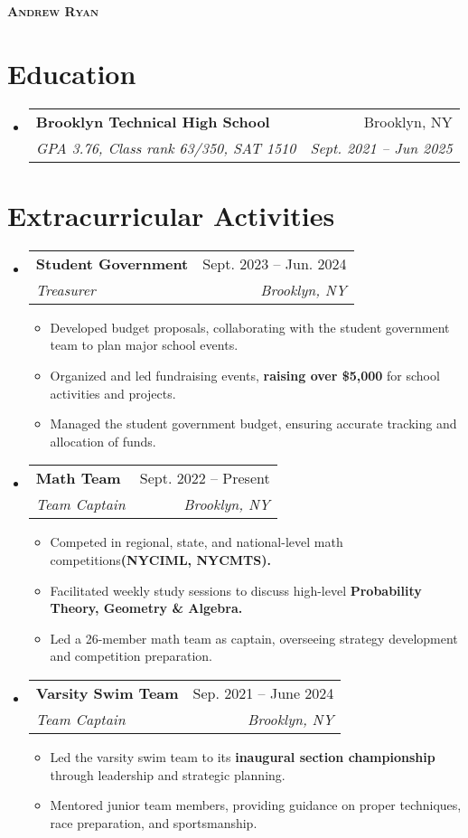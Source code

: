 \documentclass[letterpaper,11pt]{article}
\makeatletter
\newcommand{\resumeItem}[1]{
  \item\small{
    {#1 \vspace{-2pt}}
  }
}
\newcommand{\resumeSubheading}[4]{
  \vspace{-2pt}\item
    \begin{tabular*}{0.97\textwidth}[t]{l@{\extracolsep{\fill}}r}
      \textbf{#1} & #2 \\
      \textit{\small#3} & \textit{\small #4} \\
    \end{tabular*}\vspace{-7pt}
}
\newcommand{\resumeSubHeadingListStart}{\begin{itemize}[leftmargin=0.15in, label={}]}
\newcommand{\resumeSubHeadingListEnd}{\end{itemize}}
\newcommand{\resumeItemListStart}{\begin{itemize}}
\newcommand{\resumeItemListEnd}{\end{itemize}\vspace{-5pt}}
\makeatother
\begin{document}
\begin{center}
    \textbf{\Huge \scshape Andrew Ryan}
\end{center}


\section{Education}
  \resumeSubHeadingListStart
    \resumeSubheading
      {Brooklyn Technical High School}{Brooklyn, NY}
      {GPA 3.76, Class rank 63/350, SAT 1510}{Sept. 2021 -- Jun 2025}
  \resumeSubHeadingListEnd


\section{Extracurricular Activities}
  \resumeSubHeadingListStart

    \resumeSubheading
      {Student Government}{Sept. 2023 -- Jun. 2024}
      {Treasurer}{Brooklyn, NY}
      \resumeItemListStart
        \resumeItem{Developed budget proposals, collaborating with the student government team to plan major school events.}
        \resumeItem{Organized and led fundraising events, \textbf{raising over \$5,000} for school activities and projects.}
        \resumeItem{Managed the student government budget, ensuring accurate tracking and allocation of funds.}
    
      \resumeItemListEnd
      
    \resumeSubheading
      {Math Team}{Sept. 2022 -- Present}
      {Team Captain}{Brooklyn, NY}
      \resumeItemListStart
        \resumeItem{Competed in regional, state, and national-level math competitions\textbf{(NYCIML, NYCMTS).}}
        \resumeItem{Facilitated weekly study sessions to discuss high-level \textbf{Probability Theory, Geometry \& Algebra.}}
        \resumeItem{Led a 26-member math team as captain, overseeing strategy development and competition preparation.}
      \resumeItemListEnd
    
    \resumeSubheading
      {Varsity Swim Team}{Sep. 2021 -- June 2024}
      {Team Captain}{Brooklyn, NY}
      \resumeItemListStart
        \resumeItem{Led the varsity swim team to its \textbf{inaugural section championship} through leadership and strategic planning.}
        \resumeItem{Mentored junior team members, providing guidance on proper techniques, race preparation, and sportsmanship.}
    \resumeItemListEnd

  \resumeSubHeadingListEnd
\end{document}
